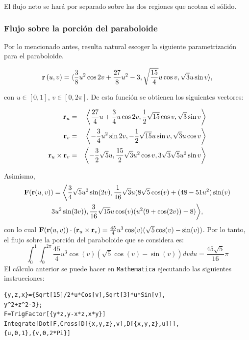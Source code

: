 \begin{parrafonumerado}
El flujo neto se hará por separado sobre las dos regiones que acotan el sólido.

\subsubsection{Flujo sobre la porción del paraboloide}
Por lo mencionado antes, resulta natural escoger la siguiente parametri\-zación para el paraboloide.

{\small
\[{\bf r}\left( u,v\right) = \langle \frac{3}{8}u^{2}\cos 2v+\frac{27}{8}u^{2}-3, \sqrt{\frac{15}{4}}u\cos v,\sqrt{3}u\sin v \rangle,\]}

con $u \in [0,1]$, $v \in [0,2\pi]$. De esta función se obtienen los siguientes vectores:

{\small
\begin{eqnarray*}
{\bf r}_{u}&=&\left\langle \frac{27}{4}u+\frac{3}{4}u\cos 2v,\frac{1}{2}\sqrt{15}\cos v,\sqrt{3}\sin v\right\rangle \\
{\bf r}_{v}&=&\left\langle -\frac{3}{4}u^{2}\sin 2v,-\frac{1}{2}\sqrt{15}u\sin v,\sqrt{3}u\cos v\right\rangle \\
{\bf r}_{u}\times {\bf r}_{v}&=&\left\langle -\frac{3}{2}\sqrt{5}u,\frac{15}{2}\sqrt{3}u^{2}\cos v, 3\sqrt{3}\sqrt{5}u^{2}\sin v\right\rangle
\end{eqnarray*}
}

Asimismo,
\begin{multline*}
{\bf F}({\bf r}(u,v))=\bigg \langle \frac{3}{4}\sqrt{5}u^2\sin(2v),
\frac{1}{16}\sqrt{3}u(8\sqrt{5}\cos(v)+(48-51u^2)\sin(v) \\
3u^2\sin(3v)), \frac{3}{16}\sqrt{15}u\cos(v)(u^2(9+\cos(2v))-8)\bigg \rangle,
\end{multline*}
con lo cual
${\bf F}({\bf r}(u,v)) \cdot \left({\bf r}_{u}\times {\bf r}_{v}\right)=\frac{45}{4} u^3\cos(v)(\sqrt{5}\cos(v)-\sin(v))$.
Por lo tanto, el flujo sobre la porción del paraboloide que se considera es:
\begin{equation} \label{flujo13}
\int_{0}^{1}\int_{0}^{2\pi}\frac{45}{4} u^3\cos(v)(\sqrt{5}\cos(v)-\sin(v)) dvdu = \frac{45 \sqrt{5}}{16} \pi
\end{equation}
El cálculo anterior se puede hacer en \verb"Mathematica" ejecutando las siguien\-tes instrucciones:

\begin{tcolorbox}[title=\bf Instrucción \verb"Mathematica"]\begin{Verbatim}[formatcom=\letraverbatim]
{y,z,x}={Sqrt[15]/2*u*Cos[v],Sqrt[3]*u*Sin[v],
y^2+z^2-3};
F=TrigFactor[{y*z,y-x*z,x*y}]
Integrate[Dot[F,Cross[D[{x,y,z},v],D[{x,y,z},u]]],
{u,0,1},{v,0,2*Pi}]
\end{Verbatim}
\end{tcolorbox}


\end{parrafonumerado}

